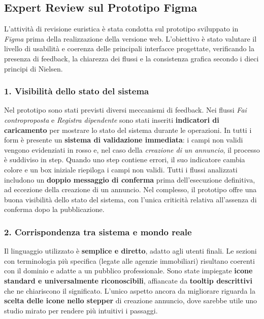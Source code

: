 \subsection{Expert Review sul Prototipo Figma}

L’attività di revisione euristica è stata condotta sul prototipo sviluppato in \textit{Figma} prima della realizzazione della versione web.  
L’obiettivo è stato valutare il livello di usabilità e coerenza delle principali interfacce progettate, verificando la presenza di feedback, la chiarezza dei flussi e la consistenza grafica secondo i dieci principi di Nielsen.  

\subsubsection*{1. Visibilità dello stato del sistema}  
Nel prototipo sono stati previsti diversi meccanismi di feedback.  
Nei flussi \textit{Fai controproposta} e \textit{Registra dipendente} sono stati inseriti \textbf{indicatori di caricamento} per mostrare lo stato del sistema durante le operazioni.  
In tutti i form è presente un \textbf{sistema di validazione immediata}: i campi non validi vengono evidenziati in rosso e, nel caso della \textit{creazione di un annuncio}, il processo è suddiviso in step.  
Quando uno step contiene errori, il suo indicatore cambia colore e un box iniziale riepiloga i campi non validi.  
Tutti i flussi analizzati includono un \textbf{doppio messaggio di conferma} prima dell’esecuzione definitiva, ad eccezione della creazione di un annuncio.  
Nel complesso, il prototipo offre una buona visibilità dello stato del sistema, con l’unica criticità relativa all’assenza di conferma dopo la pubblicazione.

\subsubsection*{2. Corrispondenza tra sistema e mondo reale}  
Il linguaggio utilizzato è \textbf{semplice e diretto}, adatto agli utenti finali.  
Le sezioni con terminologia più specifica (legate alle agenzie immobiliari) risultano coerenti con il dominio e adatte a un pubblico professionale.  
Sono state impiegate \textbf{icone standard e universalmente riconoscibili}, affiancate da \textbf{tooltip descrittivi} che ne chiariscono il significato.  
L’unico aspetto ancora da migliorare riguarda la \textbf{scelta delle icone nello stepper} di creazione annuncio, dove sarebbe utile uno studio mirato per rendere più intuitivi i passaggi.

